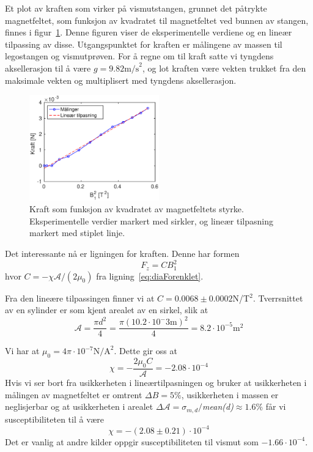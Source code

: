 \documentclass[a4paper,11pt, twocolumn]{article}
\begin{document}
Et plot av kraften som virker på vismutstangen, grunnet det påtrykte magnetfeltet, som funksjon av kvadratet til magnetfeltet ved bunnen av stangen, finnes i figur~\ref{fig:lintilpass}. Denne figuren viser de eksperimentelle verdiene og en lineær tilpassing av disse. Utgangspunktet for kraften er målingene av massen til legostangen og vismutprøven. For å regne om til kraft satte vi tyngdens aksellerasjon til å være $g=9.82\text{m/s}^2$, og lot kraften være vekten trukket fra den maksimale vekten og multiplisert med tyngdens aksellerasjon.

\begin{figure}[!ht]
	\centering
	\includegraphics[width = 0.5\textwidth]{matlab/tilpasning.eps}
	\caption{Kraft som funksjon av kvadratet av magnetfeltets styrke. Eksperimentelle verdier markert med sirkler, og lineær tilpasning markert med stiplet linje.}
	\label{fig:lintilpass}
\end{figure}
Det interessante nå er ligningen for kraften. Denne har formen
\begin{equation}
	F_z = CB_1^2
	\label{eq:linear}
\end{equation}
hvor $C=-\chi\mathcal{A}/(2\mu_0)$ fra ligning~\eqref{eq:diaForenklet}.

Fra den lineære tilpassingen finner vi at $C = 0.0068\pm0.0002$N/T$^2$. Tverrsnittet av en sylinder er som kjent arealet av en sirkel, slik at
\begin{equation}
	\mathcal{A} = \frac{\pi d^2}{4}=\frac{\pi (10.2\cdot10^-3\text{m})^2}{4}=8.2\cdot10^{-5}\text{m}^2
	\label{eq:area}
\end{equation}

Vi har at $\mu_0=4\pi\cdot10^{-7}\text{N/A}^2$. Dette gir oss at 
\begin{equation}
	\chi = -\frac{2\mu_0 C}{\mathcal{A}}= -2.08\cdot 10^{-4}
	\label{eq:susecpt}
\end{equation}
Hvis vi ser bort fra usikkerheten i lineærtilpasningen og bruker at usikkerheten i målingen av magnetfeltet er omtrent $\Delta B = 5\%$, usikkerheten i massen er neglisjerbar og at usikkerheten i arealet $\Delta\mathcal{A}=\sigma_{m,d}/$\textit{mean(d)}$\approx1.6\%$ får vi susceptibiliteten til å være 
\begin{equation}
	\chi = -(2.08\pm0.21) \cdot 10^{-4}
	\label{eq:chiResult}
\end{equation}
Det er vanlig at andre kilder oppgir susceptibiliteten til vismut som $-1.66\cdot 10^{-4}$.
\end{document}
